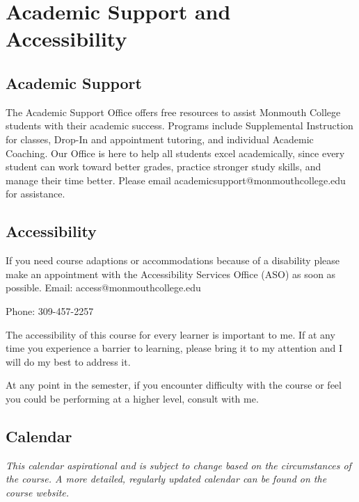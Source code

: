 \documentclass[10pt]{article}
\begin{document}
\section{Academic Support and Accessibility}

\subsection*{Academic Support}

The Academic Support Office offers free resources to assist Monmouth College students with their academic success. Programs include Supplemental Instruction for classes, Drop-In and appointment tutoring, and individual Academic Coaching. Our Office is here to help all students excel academically, since every student can work toward better grades, practice stronger study skills, and manage their time better. Please email academicsupport@monmouthcollege.edu for assistance.

\subsection*{Accessibility}

If you need course adaptions or accommodations because of a disability please make an appointment with the Accessibility Services Office (ASO) as soon as possible. Email: access@monmouthcollege.edu

Phone: 309-457-2257

The accessibility of this course for every learner is important to me. If at any time you experience a barrier to learning, please bring it to my attention and I will do my best to address it.

At any point in the semester, if you encounter difficulty with the course or feel you could be performing at a higher level, consult with me.

\subsection{Calendar}

\textit{This calendar aspirational and is subject to change based on the circumstances of the course. A more detailed, regularly updated calendar can be found on the course website. }
\end{document}

